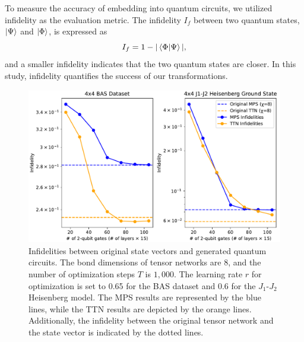 \documentclass[12pt,dvipdfmx,twoside,openright]{report}
\begin{document}
To measure the accuracy of embedding into quantum circuits, we utilized infidelity as the evaluation metric.
The infidelity $I_f$ between two quantum states, $\ket{\Psi}$ and $\ket{\Phi}$, is expressed as
\begin{equation}
    I_f = 1 - |\braket{\Phi|\Psi}|,
\end{equation}
and a smaller infidelity indicates that the two quantum states are closer.
In this study, infidelity quantifies the success of our transformations.
 \begin{figure}
    \centering
    \includegraphics[width=\linewidth]{fig_ttn_mps.pdf}
    \caption{Infidelities between original state vectors and generated quantum circuits. The bond dimensions of tensor networks are 8, and the number of optimization steps $T$ is $1,000$. The learning rate $r$ for optimization is set to 0.65 for the BAS dataset and 0.6 for the $J_1$-$J_2$ Heisenberg model. The MPS results are represented by the blue lines, while the TTN results are depicted by the orange lines. Additionally, the infidelity between the original tensor network and the state vector is indicated by the dotted lines.}
    \label{fig:result1}
\end{figure}
 
\end{document}
